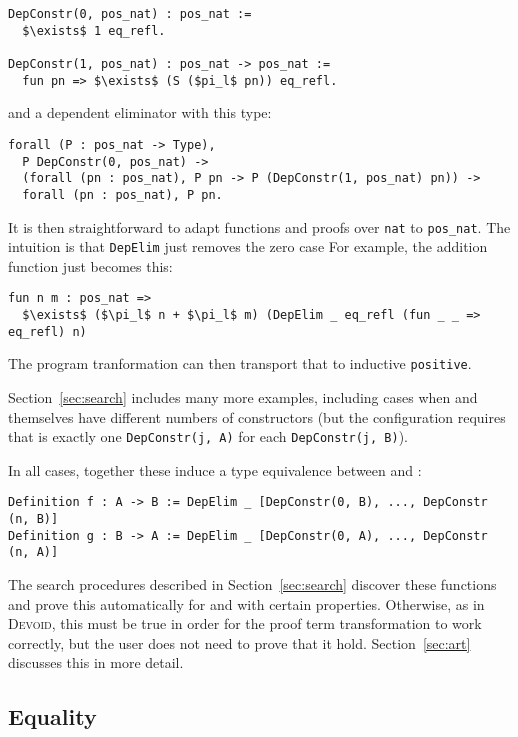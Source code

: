 \begin{lstlisting}
DepConstr(0, pos_nat) : pos_nat :=
  $\exists$ 1 eq_refl.

DepConstr(1, pos_nat) : pos_nat -> pos_nat :=
  fun pn => $\exists$ (S ($pi_l$ pn)) eq_refl.
\end{lstlisting} %
and a dependent eliminator with this type:

\begin{lstlisting}
forall (P : pos_nat -> Type),
  P DepConstr(0, pos_nat) ->
  (forall (pn : pos_nat), P pn -> P (DepConstr(1, pos_nat) pn)) ->
  forall (pn : pos_nat), P pn.
\end{lstlisting}
It is then straightforward to adapt functions and proofs over \lstinline{nat} to \lstinline{pos_nat}.
The intuition is that \lstinline{DepElim} just removes the zero case 
For example, the addition function just becomes this:

\begin{lstlisting}
fun n m : pos_nat =>
  $\exists$ ($\pi_l$ n + $\pi_l$ m) (DepElim _ eq_refl (fun _ _ => eq_refl) n)
\end{lstlisting} %
The program tranformation can then transport that to inductive \lstinline{positive}.

Section~\ref{sec:search} includes many more examples, including cases when \A and \B
themselves have different numbers of constructors (but the configuration requires that
is exactly one \lstinline{DepConstr(j, A)} for each \lstinline{DepConstr(j, B)}).

In all cases, together these induce a type equivalence between \A and \B:

\begin{lstlisting}
Definition f : A -> B := DepElim _ [DepConstr(0, B), ..., DepConstr (n, B)]
Definition g : B -> A := DepElim _ [DepConstr(0, A), ..., DepConstr (n, A)]
\end{lstlisting}
The search procedures described in Section~\ref{sec:search} discover these functions and prove this automatically
for \A and \B with certain properties.
Otherwise, as in \textsc{Devoid}, this must be true in order for the proof term transformation
to work correctly, but the user does not need to prove that it hold.
Section~\ref{sec:art} discusses this in more detail.

\subsection{Equality}
\label{sec:equality}

